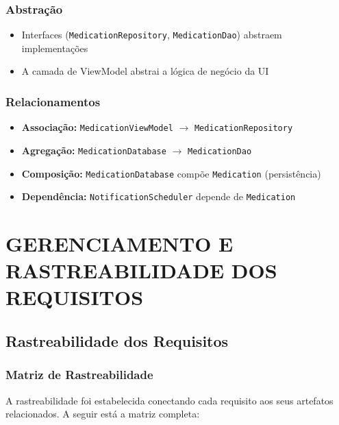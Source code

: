 \documentclass[12pt]{article}
\begin{document}
\subsubsection{Abstração}

\begin{itemize}
    \item Interfaces (\texttt{MedicationRepository}, \texttt{MedicationDao}) abstraem implementações
    \item A camada de ViewModel abstrai a lógica de negócio da UI
\end{itemize}

\subsubsection{Relacionamentos}

\begin{itemize}
    \item \textbf{Associação:} \texttt{MedicationViewModel} $\rightarrow$ \texttt{MedicationRepository}
    \item \textbf{Agregação:} \texttt{MedicationDatabase} $\rightarrow$ \texttt{MedicationDao}
    \item \textbf{Composição:} \texttt{MedicationDatabase} compõe \texttt{Medication} (persistência)
    \item \textbf{Dependência:} \texttt{NotificationScheduler} depende de \texttt{Medication}
\end{itemize}

\newpage

\section{GERENCIAMENTO E RASTREABILIDADE DOS REQUISITOS}

\subsection{Rastreabilidade dos Requisitos}

\subsubsection{Matriz de Rastreabilidade}

A rastreabilidade foi estabelecida conectando cada requisito aos seus artefatos relacionados. A seguir está a matriz completa:
\end{document}
